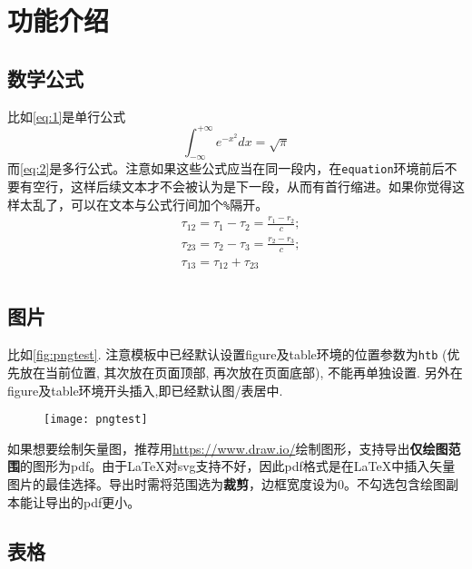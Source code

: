 \chapter{功能介绍}

\section{数学公式}

比如\autoref{eq:1}是单行公式
\begin{equation}
    \label{eq:1}
    \int_{-\infty}^{+\infty} e^{-x^2} dx = \sqrt{\pi}
\end{equation}
而\autoref{eq:2}是多行公式。注意如果这些公式应当在同一段内，在\texttt{equation}环境前后不要有空行，这样后续文本才不会被认为是下一段，从而有首行缩进。如果你觉得这样太乱了，可以在文本与公式行间加个\texttt{\%}隔开。
%
\begin{equation}\label{eq:2}
    \begin{aligned}
        & \tau_{12}=\tau_1-\tau_2=\frac{r_1-r_2}{c}; \\
        & \tau_{23}=\tau_2-\tau_3=\frac{r_2-r_3}{c}; \\
        & \tau_{13}=\tau_{12} + \tau_{23}            \\
    \end{aligned}
\end{equation}

\section{图片}

比如\autoref{fig:pngtest}. 注意模板中已经默认设置figure及table环境的位置参数为\texttt{htb} (优先放在当前位置, 其次放在页面顶部, 再次放在页面底部), 不能再单独设置. 另外在figure及table环境开头插入\texttt{\centering},即已经默认图/表居中.
\begin{figure}
    \texttt{[image: pngtest]}
    \label{fig:pngtest}
\end{figure}

如果想要绘制矢量图，推荐用\url{https://www.draw.io/}绘制图形，支持导出\textbf{仅绘图范围}的图形为pdf。由于\LaTeX 对svg支持不好，因此pdf格式是在\LaTeX 中插入矢量图片的最佳选择。导出时需将范围选为\textbf{裁剪}，边框宽度设为0。不勾选包含绘图副本能让导出的pdf更小。

\section{表格}

